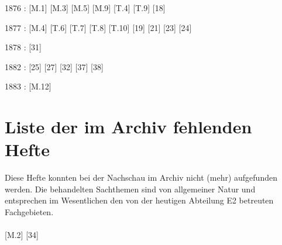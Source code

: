 1876 : [M.1] [M.3] [M.5] [M.9] [T.4] [T.9] [18]

1877 : [M.4] [T.6] [T.7] [T.8] [T.10] [19] [21] [23] [24]

1878 : [31]

1882 : [25] [27] [32] [37] [38]

1883 : [M.12]


\chapter{Liste der im Archiv fehlenden Hefte}\label{AHfehlend}
Diese Hefte konnten bei der Nachschau im Archiv nicht (mehr) aufgefunden werden. Die behandelten Sachthemen sind von allgemeiner Natur und entsprechen im Wesentlichen den von der heutigen Abteilung E2 betreuten Fachgebieten.\\
\\{}
[M.2] [34] 


